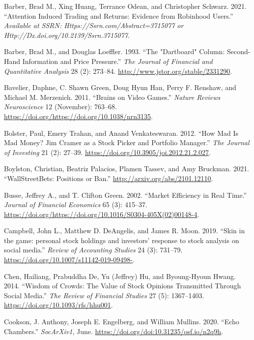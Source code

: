 \documentclass[12pt,]{article}
\begin{document}
\leavevmode\hypertarget{ref-barber2021}{}%
Barber, Brad M., Xing Huang, Terrance Odean, and Christopher Schwarz.
2021. ``Attention Induced Trading and Returns: Evidence from Robinhood
Users.'' \emph{Available at SSRN: Https://Ssrn.com/Abstract=3715077 or
Http://Dx.doi.org/10.2139/Ssrn.3715077}.

\leavevmode\hypertarget{ref-barber1993}{}%
Barber, Brad M., and Douglas Loeffler. 1993. ``The "Dartboard" Column:
Second-Hand Information and Price Pressure.'' \emph{The Journal of
Financial and Quantitative Analysis} 28 (2): 273--84.
\url{http://www.jstor.org/stable/2331290}.

\leavevmode\hypertarget{ref-bavelier2011}{}%
Bavelier, Daphne, C. Shawn Green, Doug Hyun Han, Perry F. Renshaw, and
Michael M. Merzenich. 2011. ``Brains on Video Games.'' \emph{Nature
Reviews Neuroscience} 12 (November): 763--68.
\url{https://doi.org/https://doi.org/10.1038/nrn3135}.

\leavevmode\hypertarget{ref-bolster2012}{}%
Bolster, Paul, Emery Trahan, and Anand Venkateswaran. 2012. ``How Mad Is
Mad Money? Jim Cramer as a Stock Picker and Portfolio Manager.''
\emph{The Journal of Investing} 21 (2): 27--39.
\url{https://doi.org/10.3905/joi.2012.21.2.027}.

\leavevmode\hypertarget{ref-boylston2021}{}%
Boylston, Christian, Beatriz Palacios, Plamen Tassev, and Amy Bruckman.
2021. ``WallStreetBets: Positions or Ban.''
\url{http://arxiv.org/abs/2101.12110}.

\leavevmode\hypertarget{ref-busse2002}{}%
Busse, Jeffrey A., and T. Clifton Green. 2002. ``Market Efficiency in
Real Time.'' \emph{Journal of Financial Economics} 65 (3): 415--37.
\url{https://doi.org/https://doi.org/10.1016/S0304-405X(02)00148-4}.

\leavevmode\hypertarget{ref-campbell2019}{}%
Campbell, John L., Matthew D. DeAngelis, and James R. Moon. 2019. ``Skin
in the game: personal stock holdings and investors' response to stock
analysis on social media.'' \emph{Review of Accounting Studies} 24 (3):
731--79. \url{https://doi.org/10.1007/s11142-019-09498-}.

\leavevmode\hypertarget{ref-chen2014}{}%
Chen, Hailiang, Prabuddha De, Yu (Jeffrey) Hu, and Byoung-Hyoun Hwang.
2014. ``Wisdom of Crowds: The Value of Stock Opinions Transmitted
Through Social Media.'' \emph{The Review of Financial Studies} 27 (5):
1367--1403. \url{https://doi.org/10.1093/rfs/hhu001}.

\leavevmode\hypertarget{ref-cookson2020}{}%
Cookson, J. Anthony, Joseph E. Engelberg, and William Mullins. 2020.
``Echo Chambers.'' \emph{SocArXiv1}, June.
\url{https://doi.org/doi:10.31235/osf.io/n2q9h}.
\end{document}
